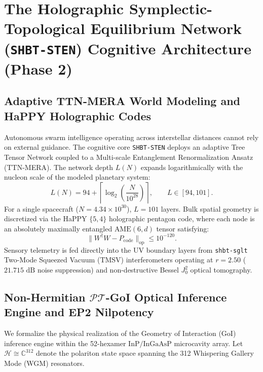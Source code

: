 \documentclass[11pt,onecolumn]{article}
\begin{document}
\section{The Holographic Symplectic-Topological Equilibrium Network (\texttt{SHBT-STEN}) Cognitive Architecture (Phase 2)}

\subsection{Adaptive TTN-MERA World Modeling and HaPPY Holographic Codes}
Autonomous swarm intelligence operating across interstellar distances cannot rely on external guidance. The cognitive core \texttt{SHBT-STEN} deploys an adaptive Tree Tensor Network coupled to a Multi-scale Entanglement Renormalization Ansatz (TTN-MERA). The network depth $L(N)$ expands logarithmically with the nucleon scale of the modeled planetary system:
\begin{equation}
L(N) = 94 + \left\lceil \log_2\left( \frac{N}{10^{28}} \right) \right\rceil, \qquad L \in [94, 101].
\label{eq:mera_adaptive_depth}
\end{equation}
For a single spacecraft ($N = 4.34 \times 10^{30}$), $L = 101$ layers. Bulk spatial geometry is discretized via the HaPPY $\{5,4\}$ holographic pentagon code, where each node is an absolutely maximally entangled $\text{AME}(6, d)$ tensor satisfying:
\begin{equation}
\|W^\dagger W - P_{\text{code}}\|_{\text{op}} \le 10^{-120}.
\label{eq:happy_ame6_isometry}
\end{equation}
Sensory telemetry is fed directly into the UV boundary layers from \texttt{shbt-sglt} Two-Mode Squeezed Vacuum (TMSV) interferometers operating at $r = 2.50$ ($21.715\text{ dB}$ noise suppression) and non-destructive Bessel $J_0^2$ optical tomography.

\FloatBarrier
\subsection{Non-Hermitian \texorpdfstring{$\mathcal{PT}$}{PT}-GoI Optical Inference Engine and EP2 Nilpotency}
\label{subsec:pt_goi_electrodynamics}
We formalize the physical realization of the Geometry of Interaction (GoI) inference engine within the 52-hexamer $\text{InP/InGaAsP}$ microcavity array. Let $\mathcal{H} \cong \mathbb{C}^{312}$ denote the polariton state space spanning the 312 Whispering Gallery Mode (WGM) resonators.
\end{document}
